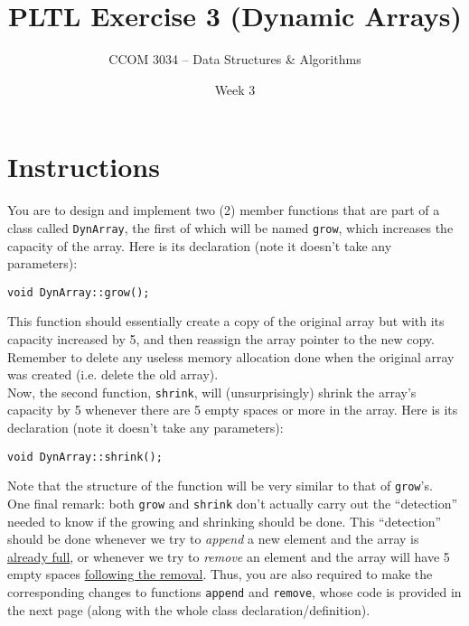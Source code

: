 \documentclass[11 pt]{article}
\title{PLTL Exercise 3 (Dynamic Arrays)}
\author{CCOM 3034 – Data Structures \& Algorithms}
\date{Week 3}
\begin{document}
\maketitle

\section{Instructions}

You are to design and implement two (2) member functions that are part of a class called \texttt{DynArray}, the first of which will be named \texttt{grow}, which increases the capacity of the array. Here is its declaration (note it doesn't take any parameters):

\begin{center}
    \texttt{void DynArray::grow();}
\end{center}

\noindent This function should essentially create a copy of the original array but with its capacity increased by 5, and then reassign the array pointer to the new copy. Remember to delete any useless memory allocation done when the original array was created (i.e. delete the old array). \\

\noindent Now, the second function, \texttt{shrink}, will (unsurprisingly) shrink the array's capacity by 5 whenever there are 5 empty spaces or more in the array. Here is its declaration (note it doesn't take any parameters):

\begin{center}
    \texttt{void DynArray::shrink();}
\end{center}

\noindent Note that the structure of the function will be very similar to that of \texttt{grow}'s. \\

\noindent One final remark: both \texttt{grow} and \texttt{shrink} don't actually carry out the ``detection'' needed to know if the growing and shrinking should be done. This ``detection'' should be done whenever we try to \textit{append} a new element and the array is \underline{already full}, or whenever we try to \textit{remove} an element and the array will have 5 empty spaces \underline{following the removal}. Thus, you are also required to make the corresponding changes to functions \texttt{append} and \texttt{remove}, whose code is provided in the next page (along with the whole class declaration/definition).
\end{document}
